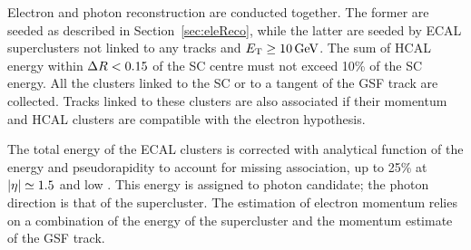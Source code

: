 Electron and photon reconstruction are conducted together.
The former are seeded as described in Section~\ref{sec:eleReco},
while the latter are seeded by ECAL superclusters not linked to any tracks and $E_{\mathrm{T}} \geq 10 \,\text{Ge\hspace{-.08em}V}$.
The sum of HCAL energy within $\Delta R < 0.15$ of the SC centre must not exceed 10\usep\% of the SC energy.
All the clusters linked to the SC or to a tangent of the GSF track are collected.
Tracks linked to these clusters are also associated if their momentum and HCAL clusters are compatible with the electron hypothesis.

The total energy of the ECAL clusters is corrected with analytical function of the energy and pseudorapidity to account for missing association,
up to 25\usep\% at $\lvert \eta \rvert \simeq 1.5$ and low \pt.
This energy is assigned to photon candidate; the photon direction is that of the supercluster.
The estimation of electron momentum
relies on a combination of the energy of the supercluster and the momentum estimate of the GSF track.
